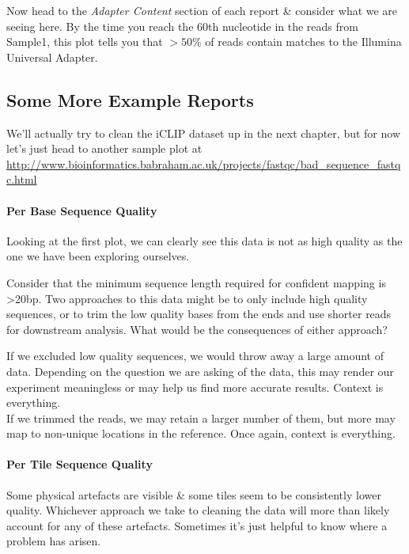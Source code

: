 Now head to the \textit{Adapter Content} section of each report \& consider what we are seeing here.
By the time you reach the 60th nucleotide in the reads from Sample1, this plot tells you that $>50$\% of reads contain matches to the Illumina Universal Adapter.


\subsection{Some More Example Reports}
We'll actually try to clean the iCLIP dataset up in the next chapter, but for now let's just head to another sample plot at \url{http://www.bioinformatics.babraham.ac.uk/projects/fastqc/bad_sequence_fastqc.html}


\paragraph{Per Base Sequence Quality}
Looking at the first plot, we can clearly see this data is not as high quality as the one we have been exploring ourselves.

\begin{questions}
Consider that the minimum sequence length required for confident mapping is >20bp.
Two approaches to this data might be to only include high quality sequences, or to trim the low quality bases from the ends and use shorter reads for downstream analysis.
What would be the consequences of either approach? \\
\begin{answer}
If we excluded low quality sequences, we would throw away a large amount of data.
Depending on the question we are asking of the data, this may render our experiment meaningless or may help us find more accurate results.
Context is everything. \\
If we trimmed the reads, we may retain a larger number of them, but more may map to non-unique locations in the reference.
Once again, context is everything.\\
\end{answer}
\end{questions}

\paragraph{Per Tile Sequence Quality}
Some physical artefacts are visible \& some tiles seem to be consistently lower quality.
Whichever approach we take to cleaning the data will more than likely account for any of these artefacts.
Sometimes it's just helpful to know where a problem has arisen.

